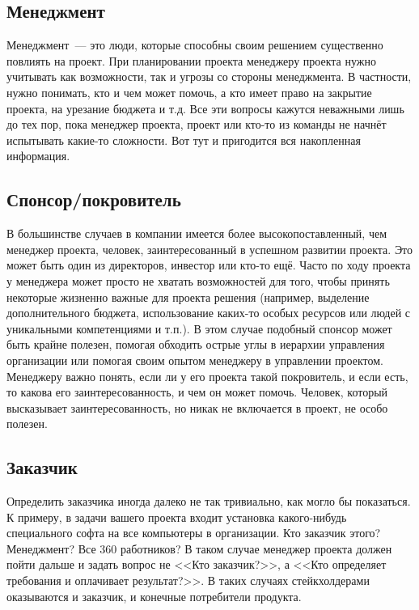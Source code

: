 \documentclass{../../text-style}
\begin{document}
\subsection{Менеджмент}

Менеджмент~--- это люди, которые способны своим решением существенно повлиять на проект. При планировании проекта менеджеру проекта нужно учитывать как возможности, так и угрозы со стороны менеджмента. В частности, нужно понимать, кто и чем может помочь, а кто имеет право на закрытие проекта, на урезание бюджета и т.д. Все эти вопросы кажутся неважными лишь до тех пор, пока менеджер проекта, проект или кто-то из команды не начнёт испытывать какие-то сложности. Вот тут и пригодится вся накопленная информация.

\subsection{Спонсор/покровитель}

В большинстве случаев в компании имеется более высокопоставленный, чем менеджер проекта, человек, заинтересованный в успешном развитии проекта. Это может быть один из директоров, инвестор или кто-то ещё. Часто по ходу проекта у менеджера может просто не хватать возможностей для того, чтобы принять некоторые жизненно важные для проекта решения (например, выделение дополнительного бюджета, использование каких-то особых ресурсов или людей с уникальными компетенциями и т.п.). В этом случае подобный спонсор может быть крайне полезен, помогая обходить острые углы в иерархии управления организации или помогая своим опытом менеджеру в управлении проектом. 
Менеджеру важно понять, если ли у его проекта такой покровитель, и если есть, то какова его заинтересованность, и чем он может помочь. Человек, который высказывает заинтересованность, но никак не включается в проект, не особо полезен.

\subsection{Заказчик}

Определить заказчика иногда далеко не так тривиально, как могло бы показаться. К примеру, в задачи вашего проекта входит установка какого-нибудь специального софта на все компьютеры в организации. Кто заказчик этого? Менеджмент? Все 360 работников? В таком случае менеджер проекта должен пойти дальше и задать вопрос не <<Кто заказчик?>>, а <<Кто определяет требования и оплачивает результат?>>. В таких случаях стейкхолдерами оказываются и заказчик, и конечные потребители продукта.
\end{document}
